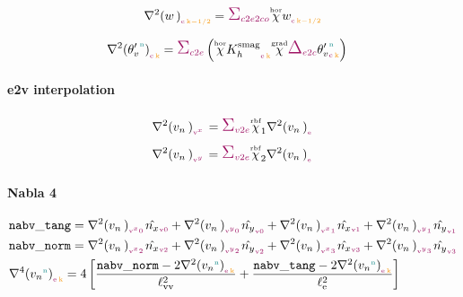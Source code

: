 \begin{equation}
  \wlapl{}{\c}{\k-1/2} = \sum_{\offProv{c2e2co}} \Whor \w{}{\c}{\k-1/2}
\end{equation}

\begin{align}
    & \vpotempprimelapl{\n}{\c}{\k} = \sum_{\offProv{c2e}} \left( \Whor \Khsmag{}{\e}{\k} \Cgrad \Gradn_{\offProv{e2c}} \vpotempprime{\n}{\c}{\k} \right)
\end{align}


\paragraph{e2v interpolation}

\begin{align}
  & \vnlapl{}{\v^x}{} = \sum_{\offProv{v2e}} \Wrbf_1 \vnlapl{}{\e}{} \\
  & \vnlapl{}{\v^y}{} = \sum_{\offProv{v2e}} \Wrbf_2 \vnlapl{}{\e}{}
\end{align}

\paragraph{Nabla 4}

\begin{align}
  & \nabvtang = \vnlapl{}{\v^x 0}{} \orientationnormx{\v 0} + \vnlapl{}{\v^y 0}{} \orientationnormy{\v 0}
              + \vnlapl{}{\v^x 1}{} \orientationnormx{\v 1} + \vnlapl{}{\v^y 1}{} \orientationnormy{\v 1}
  \\
  & \nabvnorm = \vnlapl{}{\v^x 2}{} \orientationnormx{\v 2} + \vnlapl{}{\v^y 2}{} \orientationnormy{\v 2}
              + \vnlapl{}{\v^x 3}{} \orientationnormx{\v 3} + \vnlapl{}{\v^y 3}{} \orientationnormy{\v 3}
  \\
  & \vnlapllapl{\n}{\e}{\k} = 4 \left[
            \frac{ \nabvnorm - 2 \vnlapl{\n}{\e}{\k} }{\Lvertvert^2}
          + \frac{ \nabvtang - 2 \vnlapl{\n}{\e}{\k} }{\Ledge^2}
      \right]
\end{align}


